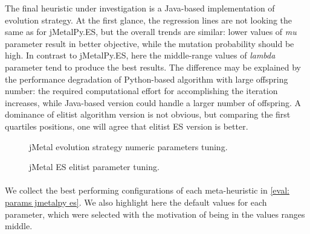 The final heuristic under investigation is a Java-based implementation of evolution strategy. At the first glance, the regression lines are not looking the same as for jMetalPy.ES, but the overall trends are similar: lower values of \emph{mu} parameter result in better objective, while the mutation probability should be high. In contrast to jMetalPy.ES, here the middle-range values of \emph{lambda} parameter tend to produce the best results. The difference may be explained by the performance degradation of Python-based algorithm with large offspring number: the required computational effort for accomplishing the iteration increases, while Java-based version could handle a larger number of offspring. A dominance of elitist algorithm version is not obvious, but comparing the first quartiles positions, one will agree that elitist ES version is better.
\begin{figure}[h]
	\centering
	\vspace{-10pt}
	
	\caption{jMetal evolution strategy numeric parameters tuning.}
	\vspace{-15pt}
	\label{eval:pict:jmetal es numeric}
\end{figure}

\begin{wrapfigure}{R}{0.5\textwidth}
	\centering
	\vspace{-20pt}
	
	\label{eval:pict:jmetal es categoric}
	\caption{jMetal ES elitist parameter tuning.}
	\vspace{-30pt}
\end{wrapfigure}

\paragraph{}
We collect the best performing configurations of each meta-heuristic in \cref{eval: params jmetalpy es}. We also highlight here the default values for each parameter, which were selected with the motivation of being in the values ranges middle.

